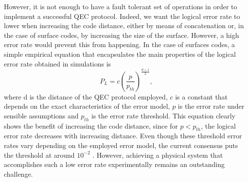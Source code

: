 However, it is not enough to have a fault tolerant set of operations in order to
implement a successful QEC protocol. Indeed, we want the logical error rate to
lower when increasing the code distance, either by means of concatenation or, in
the case of surface codes, by increasing the size of the surface. However, a high
error rate would prevent this from happening. In the case of surfaces codes, a
simple empirical equation that encapsulates the main properties of the logical
error rate obtained in simulations is
\cite{fowler12_surfac_codes}
\begin{equation}
  \label{eq:1}
  P_L = c\left(\frac{p}{p_{th}}\right)^{\frac{ d+1 }{2}},
\end{equation}
where d is the distance of the QEC protocol employed, $c$ is a constant that
depends on the exact characteristics of the error model, $p$ is the error rate
under sensible assumptions and $p_{th}$ is the error rate threshold. This
equation clearly shows the benefit of increasing the code distance, since for
$p<p_{th}$, the logical error rate decreases with increasing distance. Even
though these threshold error rates vary depending on the employed error model,
the current consensus puts the threshold at around $10^{-2}$ \cite{terhal15}
\cite{Versluis_2017}. However, achieving a physical system that accomplishes
such a low error rate experimentally remains an outstanding challenge.


